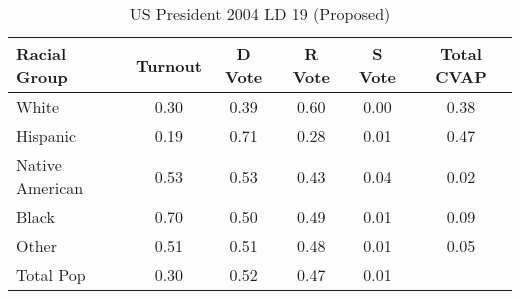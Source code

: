 \begin{table}[htb]
\begin{center}
\caption{US President 2004 LD 19 (Proposed)}
\label{pres04_cvap_ld_19}
\begin{tabular}{lccccc}
  \hline
Racial Group & Turnout & D Vote & R Vote & S Vote & Total CVAP \\ 
  \hline
White & 0.30 & 0.39 & 0.60 & 0.00 & 0.38 \\ 
  Hispanic & 0.19 & 0.71 & 0.28 & 0.01 & 0.47 \\ 
  Native American & 0.53 & 0.53 & 0.43 & 0.04 & 0.02 \\ 
  Black & 0.70 & 0.50 & 0.49 & 0.01 & 0.09 \\ 
  Other & 0.51 & 0.51 & 0.48 & 0.01 & 0.05 \\ 
  Total Pop & 0.30 & 0.52 & 0.47 & 0.01 &  \\ 
   \hline
\end{tabular}
\end{center}
\end{table}
